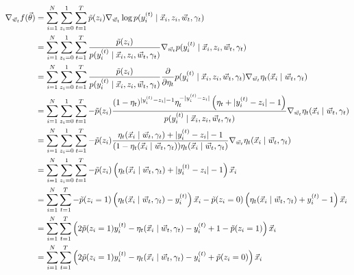         \begin{align*}
            \nabla_{\vec w_t} f(\vec \theta) &= \sum_{i = 1}^N \sum_{z_i = 0}^1 \sum_{t = 1}^T \tilde p(z_i) \nabla_{\vec w_t} \log p(y_i^{(t)}\mid \vec x_i, z_i, \vec w_t, \gamma_t)\\
                &= \sum_{i = 1}^N \sum_{z_i = 0}^1 \sum_{t = 1}^T \frac{\tilde p(z_i)}{p(y_i^{(t)} \mid \vec x_i, z_i, \vec w_t, \gamma_t)} \nabla_{\vec w_t} p(y_i^{(t)}\mid \vec x_i, z_i, \vec w_t, \gamma_t)\\
                &= \sum_{i = 1}^N \sum_{z_i = 0}^1 \sum_{t = 1}^T \frac{\tilde p(z_i)}{p(y_i^{(t)} \mid \vec x_i, z_i, \vec w_t, \gamma_t)} \frac{\partial}{\partial \eta_t} p(y_i^{(t)}\mid \vec x_i, z_i, \vec w_t, \gamma_t) \nabla_{\vec w_t} \eta_t(\vec x_i \mid \vec w_t, \gamma_t)\\
                &= \sum_{i = 1}^N \sum_{z_i = 0}^1 \sum_{t = 1}^T - \tilde p(z_i) \frac{(1-\eta_t)^{|y_i^{(t)}-z_i|-1} \eta_t^{-|y_i^{(t)}-z_i|} \left(\eta_t+|y_i^{(t)}-z_i|-1\right)}{p(y_i^{(t)} \mid \vec x_i, z_i, \vec w_t, \gamma_t)} \nabla_{\vec w_t} \eta_t(\vec x_i \mid \vec w_t, \gamma_t)\\
                &= \sum_{i = 1}^N \sum_{z_i = 0}^1 \sum_{t = 1}^T - \tilde p(z_i) \frac{\eta_t(\vec x_i \mid \vec w_t, \gamma_t)+|y_i^{(t)}-z_i|-1}{(1-\eta_t(\vec x_i \mid \vec w_t, \gamma_t)) \eta_t(\vec x_i \mid \vec w_t, \gamma_t)} \nabla_{\vec w_t} \eta_t(\vec x_i \mid \vec w_t, \gamma_t)\\
                &= \sum_{i = 1}^N \sum_{z_i = 0}^1 \sum_{t = 1}^T - \tilde p(z_i) \left(\eta_t(\vec x_i \mid \vec w_t, \gamma_t)+|y_i^{(t)}-z_i|-1\right)\vec x_i\\
                &= \sum_{i = 1}^N \sum_{t = 1}^T - \tilde p(z_i = 1) \left(\eta_t(\vec x_i \mid \vec w_t, \gamma_t) - y_i^{(t)}\right)\vec x_i - \tilde p(z_i = 0) \left(\eta_t(\vec x_i \mid \vec w_t, \gamma_t) + y_i^{(t)} - 1\right)\vec x_i\\
                &= \sum_{i = 1}^N \sum_{t = 1}^T \left(
                    2 \tilde p(z_i = 1) y_i^{(t)}
                    - \eta_t(\vec x_i \mid \vec w_t, \gamma_t)
                    - y_i^{(t)}
                    + 1
                    - \tilde p(z_i = 1)
                \right)\vec x_i\\
                &= \sum_{i = 1}^N \sum_{t = 1}^T \left(
                    2 \tilde p(z_i = 1) y_i^{(t)}
                    - \eta_t(\vec x_i \mid \vec w_t, \gamma_t)
                    - y_i^{(t)}
                    + \tilde p(z_i = 0)
                \right)\vec x_i\\
        \end{align*}

